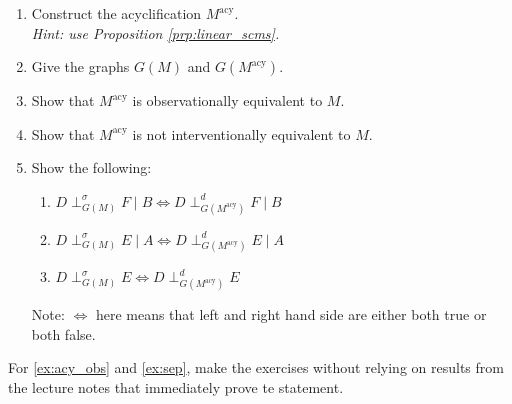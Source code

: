\begin{enumerate}
\begin{enumerate}
	\item Construct the acyclification $M^{\text{acy}}$.\\
	\emph{Hint: use Proposition \ref*{prp:linear_scms}.}
	\item Give the graphs $G(M)$ and $G(M^{\text{acy}})$.
	\item\label{ex:acy_obs} Show that $M^{\text{acy}}$ is observationally equivalent to $M$.
	\item Show that $M^{\text{acy}}$ is not interventionally equivalent to $M$.
	\item\label{ex:sep} Show the following:
	\begin{enumerate}
		\item $D \perp_{G(M)}^\sigma F \mid B \iff D \perp_{G(M^{\text{acy}})}^d F \mid B$
		\item $D \perp_{G(M)}^\sigma E \mid A \iff D \perp_{G(M^{\text{acy}})}^d E \mid A$
		\item $D \perp_{G(M)}^\sigma E \iff D \perp_{G(M^{\text{acy}})}^d E$
	\end{enumerate}
	Note: $\iff$ here means that left and right hand side are either both true or both false.
\end{enumerate}
For \ref{ex:acy_obs} and \ref{ex:sep}, make the exercises without relying on results from the lecture notes that immediately prove te statement.


\end{enumerate}

